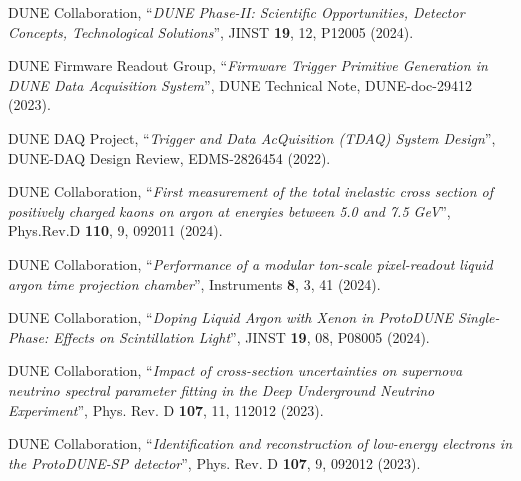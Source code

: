 \begin{list}{\scalebox{0.7}{$\square$}}{\leftmargin=1em \itemindent=0em}
	\item DUNE Collaboration, ``\textit{DUNE Phase-II: Scientific Opportunities, Detector Concepts, Technological Solutions}'', JINST \textbf{19}, 12, P12005 (2024).
	\item DUNE Firmware Readout Group, ``\textit{Firmware Trigger Primitive Generation in DUNE Data Acquisition System}'', DUNE Technical Note, DUNE-doc-29412 (2023).
	\item DUNE DAQ Project, ``\textit{Trigger and Data AcQuisition (TDAQ) System Design}'', DUNE-DAQ Design Review, EDMS-2826454 (2022). \newline
	\item DUNE Collaboration, ``\textit{First measurement of the total inelastic cross section of positively charged kaons on argon at energies between 5.0 and 7.5 GeV}'', Phys.Rev.D \textbf{110}, 9, 092011 (2024).
	\item DUNE Collaboration, ``\textit{Performance of a modular ton-scale pixel-readout liquid argon time projection chamber}'', Instruments \textbf{8}, 3, 41 (2024).
	\item DUNE Collaboration, ``\textit{Doping Liquid Argon with Xenon in ProtoDUNE Single-Phase: Effects on Scintillation Light}'', JINST \textbf{19}, 08, P08005 (2024).
	\item DUNE Collaboration, ``\textit{Impact of cross-section uncertainties on supernova neutrino spectral parameter fitting in the Deep Underground Neutrino Experiment}'', Phys. Rev. D \textbf{107}, 11, 112012 (2023).
	\item DUNE Collaboration, ``\textit{Identification and reconstruction of low-energy electrons in the ProtoDUNE-SP detector}'', Phys. Rev. D \textbf{107}, 9, 092012 (2023).
\end{list}

